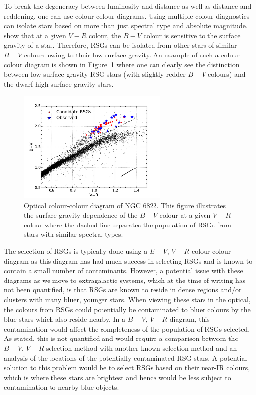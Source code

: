 To break the degeneracy between luminosity and distance as well as distance and reddening, one can use colour-colour diagrams.
Using multiple colour diagnostics can isolate stars based on more than just spectral type and absolute magnitude.
\cite{1998ApJ...501..153M} show that at a given $V-R$ colour, the $B-V$ colour is sensitive to the surface gravity of a star.
Therefore, RSGs can be isolated from other stars of similar $B-V$ colours owing to their low surface gravity.
An example of such a colour-colour diagram is shown in Figure~\ref{fig:CCD} where one can clearly see the distinction between low surface gravity RSG stars (with slightly redder $B-V$ colours) and the dwarf high surface gravity stars.

\begin{figure}
 \centering
 \includegraphics[width=0.65\textwidth]{intro/N6822_bvr}
 \caption[$B-V$, $V-R$]{Optical colour-colour diagram of NGC 6822. This figure illustrates the surface gravity dependence of the $B-V$ colour at a given $V-R$ colour where the dashed line separates the population of RSGs from stars with similar spectral types.
 \label{fig:CCD}}
\end{figure}

The selection of RSGs is typically done using a $B-V$, $V-R$ colour-colour diagram as this diagram has had much success in selecting RSGs and is known to contain a small number of contaminants.
However, a potential issue with these diagrams as we move to extragalactic systems, which at the time of writing has not been quantified, is that RSGs are known to reside in dense regions and/or clusters with many bluer, younger stars.
When viewing these stars in the optical, the colours from RSGs could potentially be contaminated to bluer colours by the blue stars which also reside nearby.
In a $B-V$, $V-R$ diagram, this contamination would affect the completeness of the population of RSGs selected.
As stated, this is not quantified and would require a comparison between the $B-V$, $V-R$ selection method with another known selection method and an analysis of the locations of the potentially contaminated RSG stars.
A potential solution to this problem would be to select RSGs based on their near-IR colours, which is where these stars are brightest and hence would be less subject to contamination to nearby blue objects.

